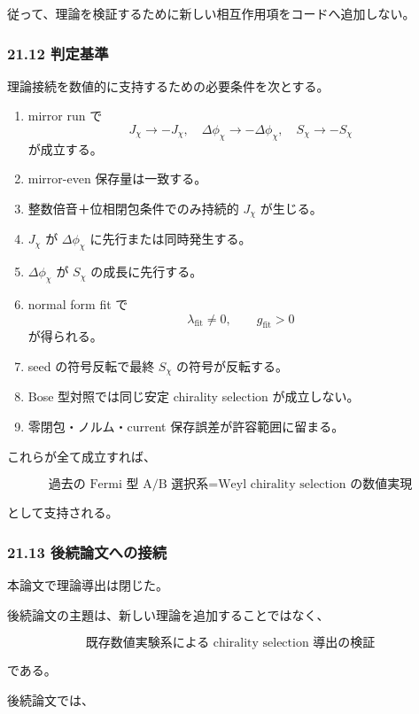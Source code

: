 \documentclass[
  a4paper,
]{ltjsarticle}
\begin{document}
従って、理論を検証するために新しい相互作用項をコードへ追加しない。

\subsubsection{21.12 判定基準}\label{ux5224ux5b9aux57faux6e96}

理論接続を数値的に支持するための必要条件を次とする。

\begin{enumerate}
\def\labelenumi{\arabic{enumi}.}
\item
  mirror run で \[
  J_\chi\to-J_\chi,\quad
  \Delta\phi_\chi\to-\Delta\phi_\chi,\quad
  S_\chi\to-S_\chi
  \] が成立する。
\item
  mirror-even 保存量は一致する。
\item
  整数倍音＋位相閉包条件でのみ持続的 \(J_\chi\) が生じる。
\item
  \(J_\chi\) が \(\Delta\phi_\chi\) に先行または同時発生する。
\item
  \(\Delta\phi_\chi\) が \(S_\chi\) の成長に先行する。
\item
  normal form fit で \[
  \lambda_{\mathrm{fit}}\neq0,
  \qquad
  g_{\mathrm{fit}}>0
  \] が得られる。
\item
  seed の符号反転で最終 \(S_\chi\) の符号が反転する。
\item
  Bose 型対照では同じ安定 chirality selection が成立しない。
\item
  零閉包・ノルム・current 保存誤差が許容範囲に留まる。
\end{enumerate}

これらが全て成立すれば、

\[
\boxed{
\text{過去の Fermi 型 A/B 選択系}
=
\text{Weyl chirality selection の数値実現}
}
\tag{191}
\]

として支持される。

\subsubsection{21.13
後続論文への接続}\label{ux5f8cux7d9aux8ad6ux6587ux3078ux306eux63a5ux7d9a}

本論文で理論導出は閉じた。

後続論文の主題は、新しい理論を追加することではなく、

\[
\boxed{
\text{既存数値実験系による chirality selection 導出の検証}
}
\tag{192}
\]

である。

後続論文では、
\end{document}
